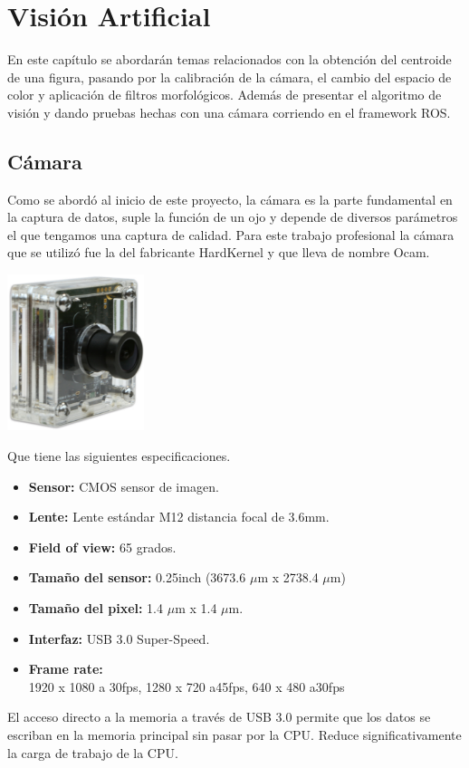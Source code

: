 \chapter{Visión Artificial}

En este capítulo se abordarán temas relacionados con la obtención del centroide de una figura, pasando por la calibración de la
cámara, el cambio del espacio de color y aplicación de filtros morfológicos. Además de presentar el algoritmo de visión y
dando pruebas hechas con una cámara corriendo en el framework ROS.

\section{Cámara}
Como se abordó al inicio de este proyecto, la cámara es la parte fundamental en
la captura de datos, suple la función de un ojo y depende de diversos
parámetros el que tengamos una captura de calidad. Para este trabajo profesional
la cámara que se utilizó fue la del fabricante HardKernel y que lleva de nombre
Ocam.
\begin{center}
	\includegraphics[width=0.3\textwidth]{Contenido/Cuerpo/Capitulo4/Fig0_1.eps}
	\label{Fig1}
\end{center}
Que tiene las siguientes especificaciones.
\begin{itemize}
    \item \textbf{Sensor:} CMOS sensor de imagen.
    \item \textbf{Lente: } Lente estándar M12 distancia focal de 3.6mm.
    \item \textbf{Field of view: } 65 grados.
    \item \textbf{Tamaño del sensor: }0.25inch (3673.6 $\mu$m x 2738.4 $\mu$m)
    \item \textbf{Tamaño del pixel: } 1.4 $\mu$m x 1.4 $\mu$m.
    \item \textbf{Interfaz: }USB 3.0 Super-Speed.
    \item \textbf{Frame rate: }\\
          1920 x 1080 a 30fps, 1280 x 720 a45fps, 640 x 480 a30fps
\end{itemize}
El acceso directo a la memoria a través de USB 3.0 permite que los datos se
escriban en la memoria principal sin pasar por la CPU. Reduce significativamente
la carga de trabajo de la CPU.

